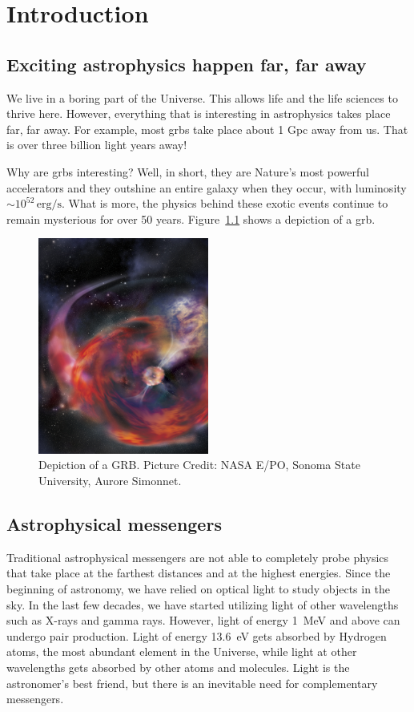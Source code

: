 \chapter{Introduction}

\section{Exciting astrophysics happen far, far away}

We live in a boring part of the Universe. This allows life and the life sciences to thrive here. However, everything that is interesting in astrophysics takes place far, far away. For example, most \gls{grbs} take place about 1 Gpc away from us. That is over three billion light years away! 

Why are \gls{grbs} interesting? Well, in short, they are Nature's most powerful accelerators and they outshine an entire galaxy when they occur, with luminosity $\sim10^{52}\,\mbox{erg/s}$. What is more, the physics behind these exotic events continue to remain mysterious for over 50 years. Figure~\ref{grb} shows a depiction of a \gls{grb}.

\begin{figure}
\centering
\includegraphics[width=0.5\textwidth]{figures/grb_xmas.jpg}
\caption{Depiction of a GRB. Picture Credit: NASA E/PO, Sonoma State University, Aurore Simonnet.}
\label{grb}
\end{figure}

\section{Astrophysical messengers}

Traditional astrophysical messengers are not able to completely probe physics that take place at the farthest distances and at the highest energies. Since the beginning of astronomy, we have relied on optical light to study objects in the sky. In the last few decades, we have started utilizing light of other wavelengths such as X-rays and gamma rays. However, light of energy 1~MeV and above can undergo pair production. Light of energy 13.6~eV gets absorbed by Hydrogen atoms, the most abundant element in the Universe, while light at other wavelengths gets absorbed by other atoms and molecules. Light is the astronomer's best friend, but there is an inevitable need for complementary messengers.

